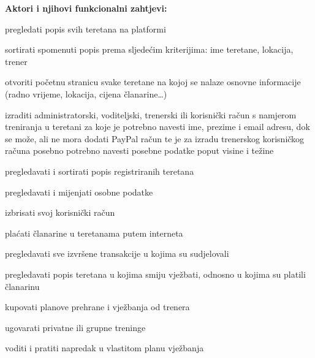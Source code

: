 			\noindent \textbf{Aktori i njihovi funkcionalni zahtjevi:}
			
			
			\begin{packed_enum}
				\item  {}
				
				\begin{packed_enum}
					
					\item pregledati popis svih teretana na platformi
					\item sortirati spomenuti popis prema sljedećim kriterijima: ime teretane, lokacija, trener
					\item otvoriti početnu stranicu svake teretane na kojoj se nalaze osnovne informacije (radno vrijeme, lokacija, cijena
					članarine…)
					\item izraditi administratorski, voditeljski, trenerski ili korisnički račun s namjerom treniranja u teretani za koje je potrebno navesti ime, prezime i email adresu, dok se može, ali ne mora dodati PayPal račun te je za izradu trenerskog korisničkog računa posebno potrebno navesti posebne podatke poput visine i težine
					
					
				\end{packed_enum}
			
				\item  {}
				
				\begin{packed_enum}
					
					\item pregledavati i sortirati popis registriranih teretana
					\item pregledavati i mijenjati osobne podatke
					\item izbrisati svoj korisnički račun
					\item plaćati članarine u teretanama putem interneta
					\item pregledavati sve izvršene transakcije u kojima su sudjelovali
					\item pregledavati popis teretana u kojima smiju vježbati, odnosno u kojima su platili članarinu
					\item kupovati planove prehrane i vježbanja od trenera
					\item ugovarati privatne ili grupne treninge
					\item voditi i pratiti napredak u vlastitom planu vježbanja
					

\end{packed_enum}
\end{packed_enum}
